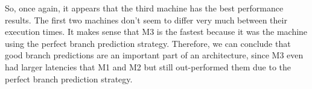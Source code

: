 \documentclass[10pt]{article} %
\begin{document}
\begin{enumerate}
So, once again, it appears that the third machine has the best performance results.  The first two machines don't seem to differ very much between their execution times.  It makes sense that M3 is the fastest because it was the machine using the perfect branch prediction strategy.  Therefore, we can conclude that good branch predictions are an important part of an architecture, since M3 even had larger latencies that M1 and M2 but still out-performed them due to the perfect branch prediction strategy.  

\end{enumerate}
\end{document}
